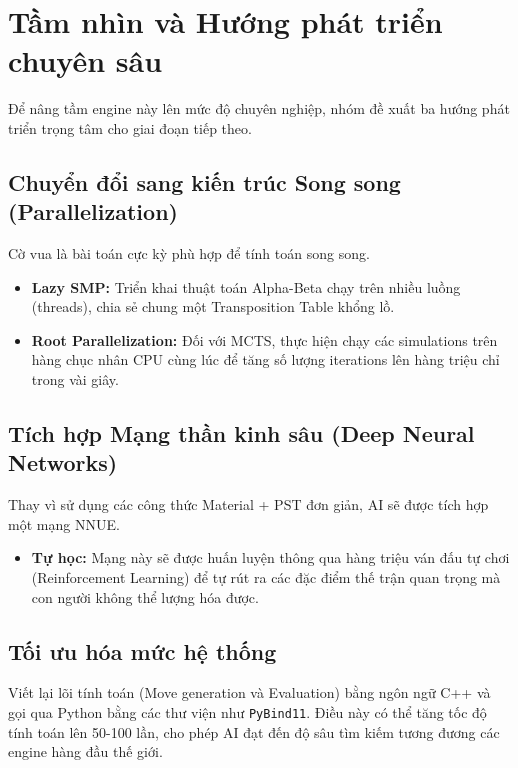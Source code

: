 \section{Tầm nhìn và Hướng phát triển chuyên sâu}

Để nâng tầm engine này lên mức độ chuyên nghiệp, nhóm đề xuất ba hướng phát triển trọng tâm cho giai đoạn tiếp theo.

\subsection{Chuyển đổi sang kiến trúc Song song (Parallelization)}
Cờ vua là bài toán cực kỳ phù hợp để tính toán song song. 
\begin{itemize}
    \item \textbf{Lazy SMP:} Triển khai thuật toán Alpha-Beta chạy trên nhiều luồng (threads), chia sẻ chung một Transposition Table khổng lồ.
    \item \textbf{Root Parallelization:} Đối với MCTS, thực hiện chạy các simulations trên hàng chục nhân CPU cùng lúc để tăng số lượng iterations lên hàng triệu chỉ trong vài giây.
\end{itemize}

\subsection{Tích hợp Mạng thần kinh sâu (Deep Neural Networks)}
Thay vì sử dụng các công thức Material + PST đơn giản, AI sẽ được tích hợp một mạng NNUE. 
\begin{itemize}
    \item \textbf{Tự học:} Mạng này sẽ được huấn luyện thông qua hàng triệu ván đấu tự chơi (Reinforcement Learning) để tự rút ra các đặc điểm thế trận quan trọng mà con người không thể lượng hóa được.
\end{itemize}

\subsection{Tối ưu hóa mức hệ thống}
Viết lại lõi tính toán (Move generation và Evaluation) bằng ngôn ngữ C++ và gọi qua Python bằng các thư viện như \texttt{PyBind11}. Điều này có thể tăng tốc độ tính toán lên 50-100 lần, cho phép AI đạt đến độ sâu tìm kiếm tương đương các engine hàng đầu thế giới.
